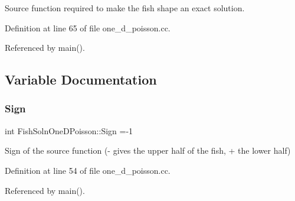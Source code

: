 Source function required to make the fish shape an exact solution. 



Definition at line 65 of file one\+\_\+d\+\_\+poisson.\+cc.



Referenced by main().



\subsection{Variable Documentation}
\mbox{\label{namespaceFishSolnOneDPoisson_a108e814ef887ffcc8caa7c65a7d30f06}} 
\subsubsection{\texorpdfstring{Sign}{Sign}}
{\footnotesize\ttfamily int Fish\+Soln\+One\+D\+Poisson\+::\+Sign =-\/1}



Sign of the source function (-\/ gives the upper half of the fish, + the lower half) 



Definition at line 54 of file one\+\_\+d\+\_\+poisson.\+cc.



Referenced by main().

